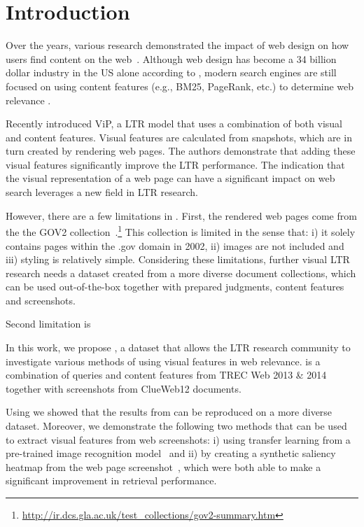 
\section{Introduction}
Over the years, various research demonstrated the impact of web design on how users find content on the web~\cite{nielsen1999designing,nielsen2006f,pernice2017f,wang2014eye}.
Although web design has become a 34 billion dollar industry in the US alone according to \citet{ibisdesign}, modern search engines are still focused on using content features (e.g., BM25, PageRank, etc.) to determine web relevance . 

Recently \citet{fan2017learning} introduced ViP, a \ac{LTR} model that uses a combination of both visual and content features.
Visual features are calculated from snapshots, which are in turn created by rendering web pages.
The authors demonstrate that adding these visual features significantly improve the \ac{LTR} performance.
The indication that the visual representation of a web page can have a significant impact on web search leverages a new field in \ac{LTR} research.

However, there are a few limitations in \cite{fan2017learning}.
First, the rendered web pages come from the the GOV2 collection~.\footnote{\url{http://ir.dcs.gla.ac.uk/test_collections/gov2-summary.htm}}
This collection is limited in the sense that: i) it solely contains pages within the .gov domain in 2002, ii) images are not included and iii) styling is relatively simple. Considering these limitations, further visual \ac{LTR} research needs a dataset created from a more diverse document collections, which can be used out-of-the-box together with prepared judgments, content features and screenshots. 

Second limitation is 

In this work, we propose \datasetname, a dataset that allows the \ac{LTR} research community to investigate various methods of using visual features in web relevance. \datasetname is a combination of queries and content features from TREC Web 2013 \& 2014 together with screenshots from ClueWeb12 documents. 

Using \datasetname we showed that the results from \citet{fan2017learning} can be reproduced on a more diverse dataset. Moreover, we demonstrate the following two methods that can be used to extract visual features from web screenshots: i) using transfer learning from a pre-trained image recognition model~\cite{donahue2014decaf}\cite{simonyan2014very} and ii) by creating a synthetic saliency heatmap from the web page screenshot~\cite{shen2014webpage}\cite{shan2017two}, which were both able to make a significant improvement in retrieval performance. 

